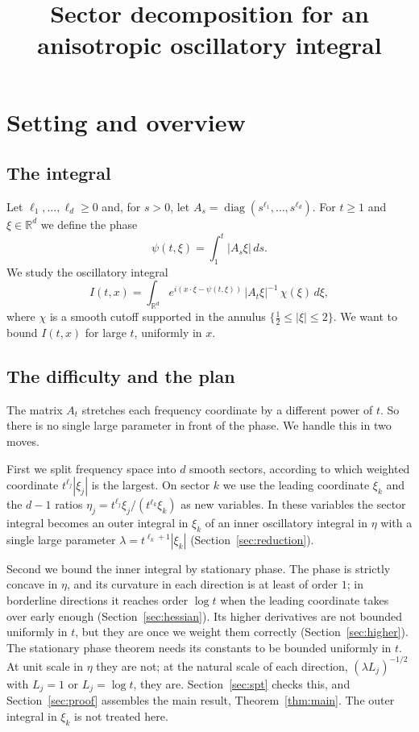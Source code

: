 \documentclass[11pt]{article}
\title{Sector decomposition for an anisotropic oscillatory integral}
\author{}
\date{}
\theoremstyle{remark}
\newcommand{\R}{\mathbb{R}}
\begin{document}
\maketitle

\section{Setting and overview}

\subsection{The integral}

Let $\ell_1,\dots,\ell_d\ge0$ and, for $s>0$, let
$A_s=\operatorname{diag}(s^{\ell_1},\dots,s^{\ell_d})$. For $t\ge1$ and $\xi\in\R^d$
we define the phase
\[
\psi(t,\xi)=\int_1^t|A_s\xi|\,ds .
\]
We study the oscillatory integral
\[
I(t,x)=\int_{\R^d}e^{i(x\cdot\xi-\psi(t,\xi))}\,|A_t\xi|^{-1}\,\chi(\xi)\,d\xi ,
\]
where $\chi$ is a smooth cutoff supported in the annulus $\{\tfrac12\le|\xi|\le2\}$.
We want to bound $I(t,x)$ for large $t$, uniformly in $x$.

\subsection{The difficulty and the plan}

The matrix $A_t$ stretches each frequency coordinate by a different power of $t$.
So there is no single large parameter in front of the phase. We handle this in two
moves.

First we split frequency space into $d$ smooth sectors, according to which weighted
coordinate $t^{\ell_j}|\xi_j|$ is the largest. On sector $k$ we use the leading
coordinate $\xi_k$ and the $d-1$ ratios $\eta_j=t^{\ell_j}\xi_j/(t^{\ell_k}\xi_k)$ as
new variables. In these variables the sector integral becomes an outer integral in
$\xi_k$ of an inner oscillatory integral in $\eta$ with a single large parameter
$\lambda=t^{\ell_k+1}|\xi_k|$ (Section~\ref{sec:reduction}).

Second we bound the inner integral by stationary phase. The phase is strictly
concave in $\eta$, and its curvature in each direction is at least of order $1$; in
borderline directions it reaches order $\log t$ when the leading coordinate takes
over early enough (Section~\ref{sec:hessian}). Its higher derivatives are not
bounded uniformly in $t$, but they are once we weight them correctly
(Section~\ref{sec:higher}). The stationary phase theorem needs its constants to be
bounded uniformly in $t$. At unit scale in $\eta$ they are not; at the natural scale
of each direction, $(\lambda L_j)^{-1/2}$ with $L_j=1$ or $L_j=\log t$, they are.
Section~\ref{sec:spt} checks this, and Section~\ref{sec:proof} assembles the main
result, Theorem~\ref{thm:main}. The outer integral in $\xi_k$ is not treated here.
\end{document}
